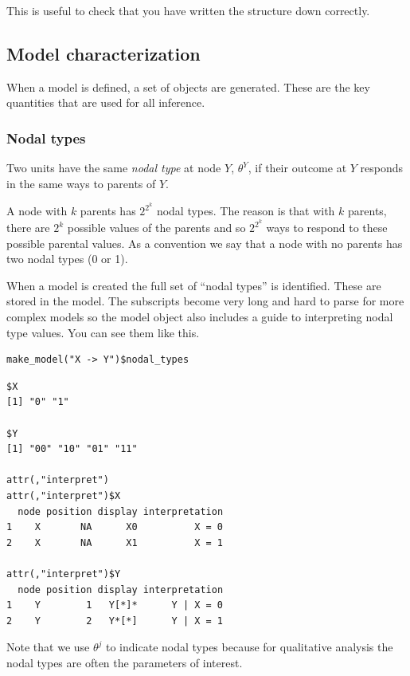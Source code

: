 \documentclass[
  article]{jss}
\begin{document}
This is useful to check that you have written the structure down
correctly.

\hypertarget{model-characterization}{%
\subsection{Model characterization}\label{model-characterization}}

When a model is defined, a set of objects are generated. These are the
key quantities that are used for all inference.

\hypertarget{nodal-types}{%
\subsubsection{Nodal types}\label{nodal-types}}

Two units have the same \emph{nodal type} at node \(Y\), \(\theta^Y\),
if their outcome at \(Y\) responds in the same ways to parents of \(Y\).

A node with \(k\) parents has \(2^{2^k}\) nodal types. The reason is
that with \(k\) parents, there are \(2^k\) possible values of the
parents and so \(2^{2^k}\) ways to respond to these possible parental
values. As a convention we say that a node with no parents has two nodal
types (0 or 1).

When a model is created the full set of ``nodal types'' is identified.
These are stored in the model. The subscripts become very long and hard
to parse for more complex models so the model object also includes a
guide to interpreting nodal type values. You can see them like this.

\begin{verbatim}
make_model("X -> Y")$nodal_types
\end{verbatim}

\begin{verbatim}
$X
[1] "0" "1"

$Y
[1] "00" "10" "01" "11"

attr(,"interpret")
attr(,"interpret")$X
  node position display interpretation
1    X       NA      X0          X = 0
2    X       NA      X1          X = 1

attr(,"interpret")$Y
  node position display interpretation
1    Y        1   Y[*]*      Y | X = 0
2    Y        2   Y*[*]      Y | X = 1
\end{verbatim}

Note that we use \(\theta^j\) to indicate nodal types because for
qualitative analysis the nodal types are often the parameters of
interest.
\end{document}
